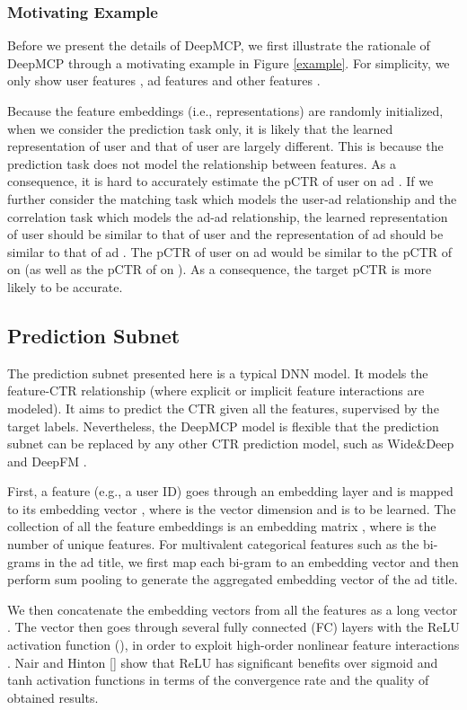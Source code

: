 \documentclass{article}
\begin{document}
\subsubsection{Motivating Example}
Before we present the details of DeepMCP, we first illustrate the rationale of DeepMCP through a motivating example in Figure \ref{example}. For simplicity, we only show user features , ad features   and other features .

Because the feature embeddings (i.e., representations) are randomly initialized, when we consider the prediction task only, it is likely that the learned representation of user  and that of user  are largely different. This is because the prediction task does not model the relationship between features.
As a consequence, it is hard to accurately estimate the pCTR of user  on ad .
If we further consider the matching task which models the user-ad relationship and the correlation task which models the ad-ad relationship, the learned representation of user  should be similar to that of user  and the representation of ad  should be similar to that of ad . The pCTR of user  on ad  would be similar to the pCTR of  on  (as well as the pCTR of  on ). As a consequence, the target pCTR is more likely to be accurate.

\subsection{Prediction Subnet}
The prediction subnet presented here is a typical DNN model. It models the feature-CTR relationship (where explicit or implicit feature interactions are modeled). It aims to predict the CTR given all the features, supervised by the target labels.
Nevertheless, the DeepMCP model is flexible that the prediction subnet can be replaced by any other CTR prediction model, such as Wide\&Deep \cite{cheng2016wide} and DeepFM \cite{guo2017deepfm}.

First, a feature  (e.g., a user ID) goes through an embedding layer and is mapped to its embedding vector , where  is the vector dimension and  is to be learned. The collection of all the feature embeddings is an embedding matrix , where  is the number of unique features. For multivalent categorical features such as the bi-grams in the ad title, we first map each bi-gram to an embedding vector and then perform sum pooling to generate the aggregated embedding vector of the ad title.

We then concatenate the embedding vectors from all the features as a long vector .
The vector  then goes through several fully connected (FC) layers with the ReLU activation function (), in order to exploit high-order nonlinear feature interactions \cite{he2017neural}. Nair and Hinton [\citeyear{nair2010rectified}] show that ReLU has significant benefits over sigmoid and tanh activation functions in terms of the convergence rate and the quality of obtained results.
\end{document}
